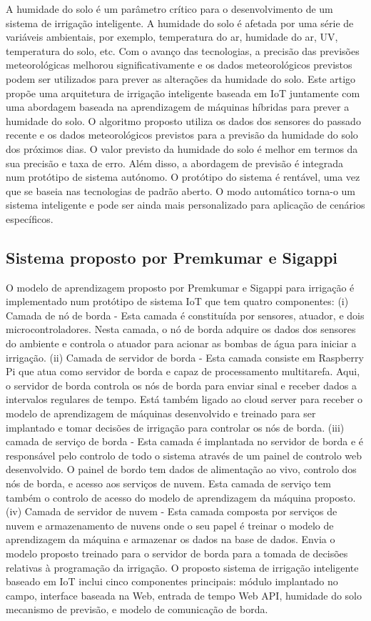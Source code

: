 \documentclass[conference]{IEEEtran}
\begin{document}
A humidade do solo é um parâmetro crítico para o desenvolvimento de um
sistema de irrigação inteligente. A humidade do solo é afetada por uma
série de variáveis ambientais, por exemplo, temperatura do ar,
humidade do ar, UV, temperatura do solo, etc. Com o avanço das tecnologias,
a precisão das previsões meteorológicas melhorou significativamente e
os dados meteorológicos previstos podem ser utilizados para prever as
alterações da humidade do solo. Este artigo propõe uma arquitetura
de irrigação inteligente baseada em IoT juntamente com uma abordagem
baseada na aprendizagem de máquinas híbridas para prever a humidade do solo.
O algoritmo proposto utiliza os dados dos sensores do passado recente e
os dados meteorológicos previstos para a previsão da humidade do solo
dos próximos dias. O valor previsto da humidade do solo é melhor em
termos da sua precisão e taxa de erro. Além disso, a abordagem de
previsão é integrada num protótipo de sistema autónomo. O protótipo
do sistema é rentável, uma vez que se baseia nas tecnologias de padrão aberto.
O modo automático torna-o um sistema inteligente e pode ser ainda
mais personalizado para aplicação de cenários específicos. \cite{goap2018an}

\subsection{Sistema proposto por Premkumar e Sigappi}

O modelo de aprendizagem proposto por Premkumar e Sigappi \cite{premkumar2022iot} para irrigação é implementado num protótipo
de sistema IoT que tem quatro componentes: (i) Camada de nó de borda -
Esta camada é constituída por sensores, atuador, e dois microcontroladores.
Nesta camada, o nó de borda adquire os dados dos sensores do ambiente e controla
o atuador para acionar as bombas de água para iniciar a irrigação.
(ii) Camada de servidor de borda - Esta camada consiste em Raspberry Pi que
atua como servidor de borda e capaz de processamento multitarefa. Aqui, o
servidor de borda controla os nós de borda para enviar sinal e receber dados
a intervalos regulares de tempo. Está também ligado ao cloud server para receber
o modelo de aprendizagem de máquinas desenvolvido e treinado para ser implantado
e tomar decisões de irrigação para controlar os nós de borda.
(iii) camada de serviço de borda - Esta camada é implantada no servidor de
borda e é responsável pelo controlo de todo o sistema através de um painel de
controlo web desenvolvido. O painel de bordo tem dados de alimentação ao vivo,
controlo dos nós de borda, e acesso aos serviços de nuvem. Esta camada de
serviço tem também o controlo de acesso do modelo de aprendizagem da máquina
proposto. (iv) Camada de servidor de nuvem - Esta camada composta por serviços
de nuvem e armazenamento de nuvens onde o seu papel é treinar o modelo de
aprendizagem da máquina e armazenar os dados na base de dados. Envia o modelo
proposto treinado para o servidor de borda para a tomada de decisões relativas
à programação da irrigação. O proposto sistema de irrigação inteligente baseado
em IoT inclui cinco componentes principais: módulo implantado no campo,
interface baseada na Web, entrada de tempo Web API, humidade do solo
mecanismo de previsão, e modelo de comunicação de borda.
\end{document}

